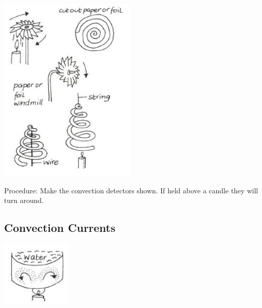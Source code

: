 \begin{multicols}{2}
\begin{center}
\includegraphics[width=0.49\textwidth]{./img/vso/convection-detectors.jpg}
\end{center}

\begin{description*}
\item[Procedure:]{Make the convection detectors shown. If held above a candle they will turn around.}
\end{description*}

\columnbreak

\subsection{Convection Currents}

\begin{center}
\includegraphics[width=0.25\textwidth]{./img/vso/convection-currents.jpg}
\end{center}


\end{multicols}
